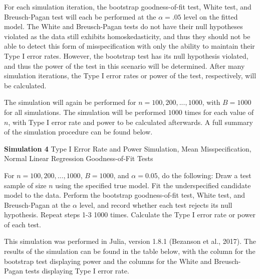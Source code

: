 		For each simulation iteration, the bootstrap goodness-of-fit test, White test, and Breusch-Pagan test will each be performed at the $\alpha = .05$ level on the 
		fitted model. The White and Breusch-Pagan tests do not have their null hypotheses violated as the data still exhibits homoskedasticity, and thus they should not be able to
		detect this form of misspecification with only the ability to maintain their Type I error rates. However, the bootstrap test has its null hypothesis violated,
		and thus the power of the test in this scenario will be determined. After many simulation iterations, the Type I error rates or power of the test, respectively,
		will be calculated.

		The simulation will again be performed for $n = 100,200,...,1000$, with $B = 1000$ for all simulations. The simulation will be performed $1000$ times for each value of $n$, with
		Type I error rate and power to be calculated afterwards. A full summary of the simulation procedure can be found below.
		\begin{algorithm}[H]
			\caption*{\textbf{Simulation 4} Type I Error Rate and Power Simulation, Mean Misspecification, Normal Linear Regression Goodness-of-Fit Tests}
			\begin{algorithmic}[1]
			  \Statex For $n = 100,200,...,1000$, $B = 1000$, and $\alpha = 0.05$, do the following:
			  \State Draw a test sample of size $n$ using the specified true model.
			  \State Fit the underspecified candidate model to the data.
			  \State Perform the bootstrap goodness-of-fit test, White test, and Breusch-Pagan at the $\alpha$ level,
			  and record whether each test rejects its null hypothesis.
			  \State Repeat steps 1-3 1000 times.
			  \State Calculate the Type I error rate or power of each test.
			\end{algorithmic}
		\end{algorithm}

		This simulation was performed in Julia, version 1.8.1 (Bezanson et al., 2017). The results of the simulation can be found in the table below, with the column for the
		bootstrap test displaying power and the columns for the White and Breusch-Pagan tests displaying Type I error rate.

